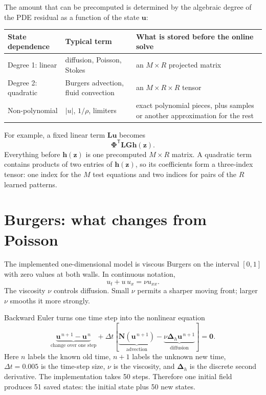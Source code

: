 \documentclass[11pt]{article}
\newcommand{\mat}[1]{\mathbf{#1}}
\newcommand{\vect}[1]{\mathbf{#1}}
\begin{document}
The amount that can be precomputed is determined by the algebraic degree of
the PDE residual as a function of the state $\vect{u}$:

\begin{center}
\begin{tabular}{@{}>{\raggedright\arraybackslash}p{}
                    >{\raggedright\arraybackslash}p{}
                    >{\raggedright\arraybackslash}p{}@{}}
\toprule
State dependence & Typical term & What is stored before the online solve \\
\midrule
Degree 1: linear & diffusion, Poisson, Stokes & an $M\times R$ projected matrix \\
Degree 2: quadratic & Burgers advection, fluid convection & an $M\times R\times R$ tensor \\
Non-polynomial & $|u|$, $1/\rho$, limiters & exact polynomial pieces, plus samples or another approximation for the rest \\
\bottomrule
\end{tabular}
\end{center}

For example, a fixed linear term $\mat{L}\vect{u}$ becomes
\begin{equation}
  \mat{\Phi}^{\mathsf T}\mat{L}\mat{G}\vect{h}(\vect{z}).
\end{equation}
Everything before $\vect{h}(\vect{z})$ is one precomputed $M\times R$
matrix.  A quadratic term contains products of two entries of
$\vect{h}(\vect{z})$, so its coefficients form a three-index tensor: one
index for the $M$ test equations and two indices for pairs of the $R$ learned
patterns.

\section{Burgers: what changes from Poisson}

The implemented one-dimensional model is viscous Burgers on the interval
$[0,1]$ with zero values at both walls.  In continuous notation,
\begin{equation}
  u_t+u\,u_x=\nu u_{xx}.
\end{equation}
The viscosity $\nu$ controls diffusion.  Small $\nu$ permits a sharper moving
front; larger $\nu$ smooths it more strongly.

Backward Euler turns one time step into the nonlinear equation
\begin{equation}
  \underbrace{\vect{u}^{\,n+1}-\vect{u}^{\,n}}_{\text{change over one step}}
  +\Delta t\left[
    \underbrace{\vect{N}(\vect{u}^{\,n+1})}_{\text{advection}}
    -\underbrace{\nu\mat{\Delta}_h\vect{u}^{\,n+1}}_{\text{diffusion}}
  \right]
  =\vect{0}.
  \label{eq:burgers-step}
\end{equation}
Here $n$ labels the known old time, $n+1$ labels the unknown new time,
$\Delta t=0.005$ is the time-step size, $\nu$ is the viscosity, and
$\mat{\Delta}_h$ is the discrete second derivative.  The implementation takes
50 steps.  Therefore one initial field produces 51 saved states: the initial
state plus 50 new states.
\end{document}
